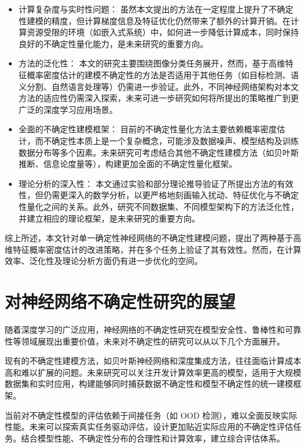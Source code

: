\begin{itemize}
    \item 计算复杂度与实时性问题： 虽然本文提出的方法在一定程度上提升了不确定性建模的精度，但计算梯度信息及特征优化仍然带来了额外的计算开销。在计算资源受限的环境（如嵌入式系统）中，如何进一步降低计算成本，同时保持良好的不确定性量化能力，是未来研究的重要方向。
    
    \item 方法的泛化性： 本文的研究主要围绕图像分类任务展开，然而，基于高维特征概率密度估计的建模不确定性的方法是否适用于其他任务（如目标检测、语义分割、自然语言处理等）仍需进一步验证。此外，不同神经网络架构对本文方法的适应性仍需深入探索，未来可进一步研究如何将所提出的策略推广到更广泛的深度学习应用场景。

    \item 全面的不确定性建模框架： 目前的不确定性量化方法主要依赖概率密度估计，而不确定性本质上是一个复杂概念，可能涉及数据噪声、模型结构及训练数据分布等多个因素。未来研究可考虑结合其他不确定性建模方法（如贝叶斯推断、信息论度量等），构建更加全面的不确定性量化框架。

    \item 理论分析的深入性： 本文通过实验和部分理论推导验证了所提出方法的有效性，但仍需更深入的数学分析，以更严格地刻画输入扰动、特征优化与不确定性量化之间的关系。此外，研究不同数据集、不同模型架构下的方法泛化性，并建立相应的理论框架，是未来研究的重要方向。
\end{itemize}

综上所述，本文针对单一确定性神经网络的不确定性建模问题，提出了两种基于高维特征概率密度估计的改进策略，并在多个任务上验证了其有效性。然而，在计算效率、泛化性及理论分析方面仍有进一步优化的空间。

\section{对神经网络不确定性研究的展望}

随着深度学习的广泛应用，神经网络的不确定性研究在模型安全性、鲁棒性和可靠性等领域展现出重要价值，未来对不确定性的研究可以从以下几个方面展开。

现有的不确定性建模方法，如贝叶斯神经网络和深度集成方法，往往面临计算成本高和难以扩展的问题。未来研究可以关注开发计算效率更高的模型，适用于大规模数据集和实时应用，构建能够同时捕获数据不确定性和模型不确定性的统一建模框架。

当前对不确定性模型的评估依赖于间接任务（如 OOD 检测），难以全面反映实际性能。未来可以探索真实任务驱动评估，设计更加贴近实际应用的不确定性评估任务。结合模型性能、不确定性分布的合理性和计算效率，建立综合评估体系。

